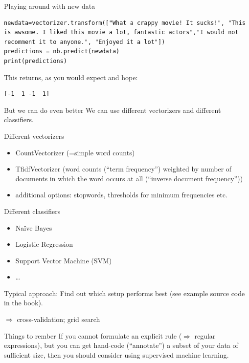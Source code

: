 \documentclass{beamer}
\begin{document}
\begin{frame}[fragile]{Playing around with new data}
\begin{lstlisting}
newdata=vectorizer.transform(["What a crappy movie! It sucks!", "This is awsome. I liked this movie a lot, fantastic actors","I would not recomment it to anyone.", "Enjoyed it a lot"])
predictions = nb.predict(newdata)
print(predictions)
\end{lstlisting}
This returns, as you would expect and hope:
\begin{lstlisting} 
[-1  1 -1  1]
\end{lstlisting}


\end{frame}




\begin{frame}{But we can do even better}
	We can use different vectorizers and different classifiers.
\end{frame}

\begin{frame}{Different vectorizers}
	\begin{itemize}
		\item CountVectorizer (=simple word counts)
		\item TfidfVectorizer (word counts (``term frequency'') weighted by number of documents in which the word occurs at all (``inverse document frequency''))
		\item additional options: stopwords, thresholds for minimum frequencies etc.
	\end{itemize}
\end{frame}

\begin{frame}{Different classifiers}
	\begin{itemize}
		\item Naïve Bayes
		\item Logistic Regression
		\item Support Vector Machine (SVM)
		\item \ldots
	\end{itemize}
Typical approach: Find out which setup performs best (see example source code in the book).

$\Rightarrow$ cross-validation; grid search
\end{frame}





\begin{frame}[plain]
	\begin{alertblock}{Things to rember}
		If you cannot formulate an explicit rule ($\Rightarrow$ regular expressions), but you can get hand-code (``annotate'') a subset of your data of sufficient size, then you should consider using supervised machine learning.
	\end{alertblock}
	
\end{frame}
\end{document}
